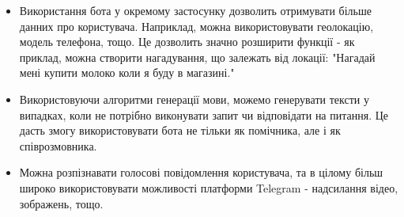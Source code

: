 \begin{itemize}
\item Використання бота у окремому застосунку дозволить отримувати більше данних про користувача.  Наприклад, можна використовувати геолокацію, модель телефона, тощо. Це дозволить значно розширити функції - як приклад, можна створити нагадування, що залежать від локації: "Нагадай мені купити молоко коли я буду в магазині."
\item Використовуючи алгоритми генерації мови, можемо генерувати тексти у випадках, коли не потрібно виконувати запит чи відповідати на питання. Це дасть змогу використовувати бота не тільки як помічника, але і  як співрозмовника. 
\item Можна розпізнавати голосові повідомлення користувача, та в цілому більш широко використовувати можливості платформи Telegram - надсилання відео, зображень, тощо.
\end{itemize}
